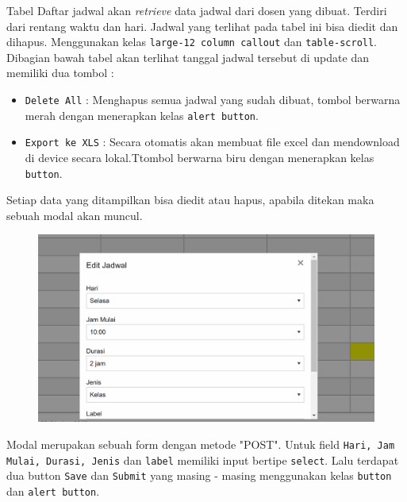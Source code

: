 \documentclass[a4paper,twoside]{article}
\begin{document}
\begin{enumerate}
		
		Tabel Daftar jadwal akan \textit{retrieve} data jadwal dari dosen yang dibuat. Terdiri dari rentang waktu dan hari. Jadwal yang terlihat pada tabel ini bisa diedit dan dihapus. Menggunakan kelas \texttt{large-12 column callout} dan \texttt{table-scroll}.
		Dibagian bawah tabel akan terlihat tanggal jadwal tersebut di update dan memiliki dua tombol :
		\begin{itemize}
			\item \texttt{Delete All} : Menghapus semua jadwal yang sudah dibuat, tombol berwarna merah dengan menerapkan kelas \texttt{alert button}.
			\item \texttt{Export ke XLS} : Secara otomatis akan membuat file excel dan mendownload di device secara lokal.Ttombol berwarna biru dengan menerapkan kelas \texttt{button}.
		\end{itemize}
		Setiap data yang ditampilkan bisa diedit atau hapus, apabila ditekan maka sebuah modal akan muncul.  
		\begin{figure} [H]
			\centering  
			\includegraphics[scale=0.5]{Modal-Daftar-Jadwal-zurb.png}  
			\caption{} 	
		\end{figure}
		Modal merupakan sebuah form dengan metode "POST". Untuk field \texttt{Hari, Jam Mulai, Durasi, Jenis} dan \texttt{label} memiliki input bertipe \texttt{select}. Lalu terdapat dua button \texttt{Save} dan \texttt{Submit} yang masing - masing menggunakan kelas \texttt{button} dan \texttt{alert button}.
		

\end{enumerate}
\end{document}
